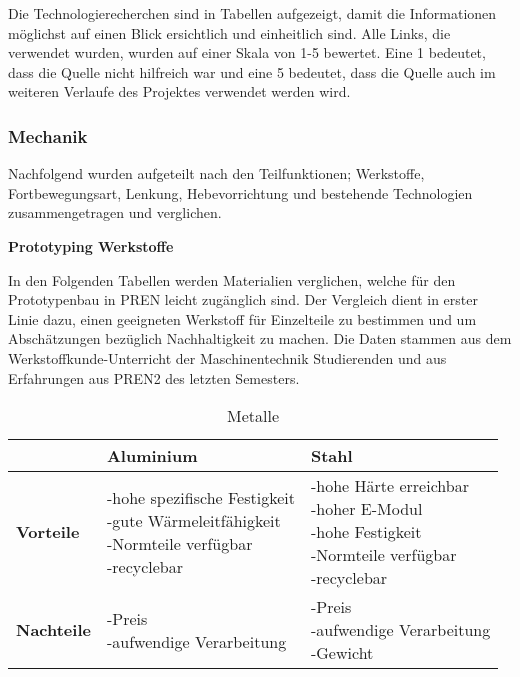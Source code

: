 Die Technologierecherchen sind in Tabellen aufgezeigt, damit die Informationen möglichst auf einen Blick ersichtlich und einheitlich sind. Alle Links, die verwendet wurden, wurden auf einer Skala von 1-5 bewertet. Eine 1 bedeutet, dass die Quelle nicht hilfreich war und eine 5 bedeutet, dass die Quelle auch im weiteren Verlaufe des Projektes verwendet werden wird.

\subsubsection{Mechanik}

Nachfolgend wurden aufgeteilt nach den Teilfunktionen; Werkstoffe, Fortbewegungsart, Lenkung, Hebevorrichtung und bestehende Technologien zusammengetragen und verglichen.

\textbf{Prototyping Werkstoffe}

In den Folgenden Tabellen werden Materialien verglichen, welche für den Prototypenbau in PREN leicht zugänglich sind. Der Vergleich dient in erster Linie dazu, einen geeigneten Werkstoff für Einzelteile zu bestimmen und um Abschätzungen bezüglich Nachhaltigkeit zu machen. Die Daten stammen aus dem Werkstoffkunde-Unterricht der Maschinentechnik Studierenden und aus Erfahrungen aus PREN2 des letzten Semesters.

\begin{table}[H]
\centering
\small
\begin{tabularx}{\textwidth}{|l|X|X|}
\hline
  \textbf{} & \textbf{Aluminium} & \textbf{Stahl} \\
  \hline
  \textbf{Vorteile}  & \makecell{-hohe spezifische Festigkeit\\ -gute Wärmeleitfähigkeit \\ -Normteile verfügbar \\ -recyclebar} & \makecell{-hohe Härte erreichbar \\-hoher E-Modul\\-hohe Festigkeit \\ -Normteile verfügbar\\ -recyclebar}\\ 
  \hline
  \textbf{Nachteile} & \makecell{-Preis \\ -aufwendige Verarbeitung \\} & \makecell{-Preis\\-aufwendige Verarbeitung \\ -Gewicht}\\
  \hline
\end{tabularx}
\caption{Metalle}
\label{table:metals-comparison}
\end{table}


